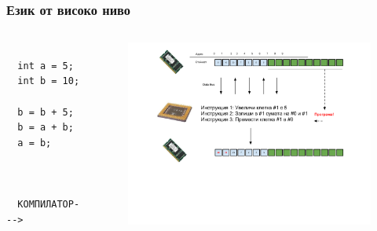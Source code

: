 \documentclass{beamer}
\begin{document}

\begin{frame}[fragile]
\frametitle{Език от високо ниво}

\begin{columns}
  \begin{column}{0.2\textwidth}
\begin{verbatim}

  int a = 5;
  int b = 10;

  b = b + 5;
  b = a + b;
  a = b;



  КОМПИЛАТОР--->

\end{verbatim}
  \end{column}
  \begin{column}{0.8\textwidth}
\begin{figure}
\includegraphics[width=10.5cm]{images/fig_program}
\end{figure}

  \end{column}
\end{columns}


\end{frame}
\end{document}

